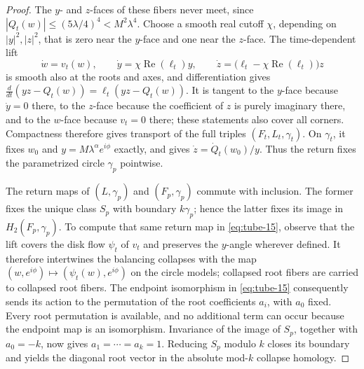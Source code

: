 \begin{proof}
The \(y\)- and \(z\)-faces of these fibers never meet, since
\(|Q_t(w)|\le(5\lambda/4)^4<M^2\lambda^4\).
Choose a smooth real cutoff \(\chi\), depending on
\(|y|^2,|z|^2\), that is zero near the \(y\)-face and one near the
\(z\)-face. The time-dependent lift
\[
 \dot w=v_t(w),\qquad
 \dot y=\chi\operatorname{Re}(\ell_t)y,\qquad
 \dot z=\bigl(\ell_t-\chi\operatorname{Re}(\ell_t)\bigr)z
\]
is smooth also at the roots and axes, and differentiation gives
\(\frac{d}{dt}(yz-Q_t(w))=\ell_t(yz-Q_t(w))\).
It is tangent to the \(y\)-face because \(\dot y=0\) there, to the
\(z\)-face because the coefficient of \(z\) is purely imaginary
there, and to the \(w\)-face because \(v_t=0\) there; these statements
also cover all corners. Compactness therefore gives transport of
the full triples \((F_t,L_t,\gamma_t)\). On \(\gamma_t\), it fixes
\(w_0\) and \(y=M\lambda^\alpha e^{i\phi}\) exactly, and gives
\(\dot z=\dot Q_t(w_0)/y\). Thus the return fixes the parametrized
circle \(\gamma_p\) pointwise.

The return maps of \((L,\gamma_p)\) and \((F_p,\gamma_p)\) commute
with inclusion. The former fixes the unique class \(S_p\) with
boundary \(k\gamma_p\); hence the latter fixes its image in
\(H_2(F_p,\gamma_p)\). To compute that same return map in
\eqref{eq:tube-15}, observe that the lift covers the disk flow
\(\psi_t\) of \(v_t\) and preserves the \(y\)-angle wherever defined.
It therefore intertwines the balancing collapses with the map
\((w,e^{i\phi})\mapsto(\psi_t(w),e^{i\phi})\) on the circle models;
collapsed root fibers are carried to collapsed root fibers.
The endpoint isomorphism in
\eqref{eq:tube-15} consequently sends its action to the permutation
of the root coefficients \(a_i\), with \(a_0\) fixed. Every root
permutation is available, and no additional term can occur because
the endpoint map is an isomorphism. Invariance of the image of
\(S_p\), together with \(a_0=-k\), now gives
\(a_1=\cdots=a_k=1\). Reducing \(S_p\) modulo \(k\)
closes its boundary and yields the diagonal root vector in the
absolute mod-\(k\) collapse homology.


\end{proof}
